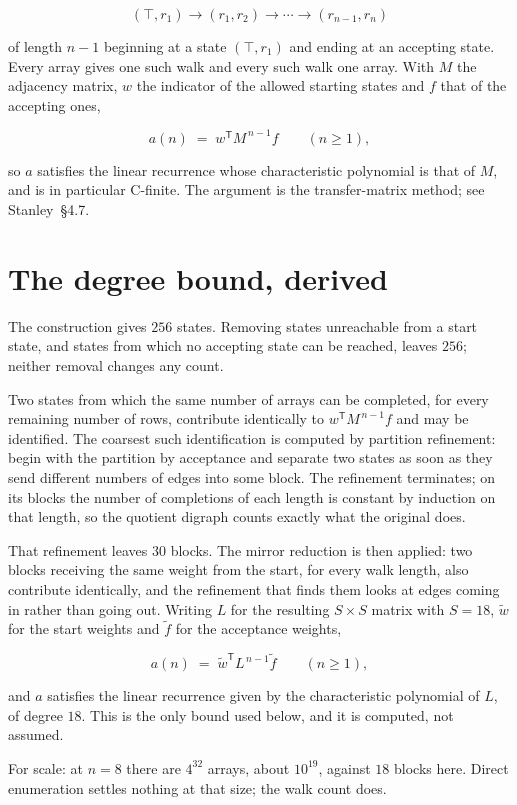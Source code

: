\documentclass[11pt]{article}
\theoremstyle{definition}
\begin{document}
\[(\top,r_1) \to (r_1,r_2) \to \cdots \to (r_{n-1},r_n)\]

of length $n-1$ beginning at a state $(\top,r_1)$ and ending at an accepting state. Every array gives one such walk and every such walk one array. With $M$ the adjacency matrix, $w$ the indicator of the allowed starting states and $f$ that of the accepting ones,

\[a(n) \;=\; w^{\mathsf T} M^{\,n-1} f \qquad (n \ge 1),\]

so $a$ satisfies the linear recurrence whose characteristic polynomial is that of $M$, and is in particular C-finite. The argument is the transfer-matrix method; see Stanley~\S4.7.

\section{The degree bound, derived}

The construction gives $256$ states. Removing states unreachable from a start state, and states from which no accepting state can be reached, leaves $256$; neither removal changes any count.

Two states from which the same number of arrays can be completed, for every remaining number of rows, contribute identically to $w^{\mathsf T}M^{\,n-1}f$ and may be identified. The coarsest such identification is computed by partition refinement: begin with the partition by acceptance and separate two states as soon as they send different numbers of edges into some block. The refinement terminates; on its blocks the number of completions of each length is constant by induction on that length, so the quotient digraph counts exactly what the original does.

That refinement leaves $30$ blocks. The mirror reduction is then applied: two blocks receiving the same weight from the start, for every walk length, also contribute identically, and the refinement that finds them looks at edges coming in rather than going out. Writing $L$ for the resulting $S \times S$ matrix with $S = 18$, $\tilde w$ for the start weights and $\tilde f$ for the acceptance weights,

\[a(n) \;=\; \tilde w^{\mathsf T} L^{\,n-1} \tilde f \qquad (n \ge 1),\]

and $a$ satisfies the linear recurrence given by the characteristic polynomial of $L$, of degree $18$. This is the only bound used below, and it is computed, not assumed.

For scale: at $n = 8$ there are $4^{32}$ arrays, about $10^{19}$, against $18$ blocks here. Direct enumeration settles nothing at that size; the walk count does.
\end{document}
